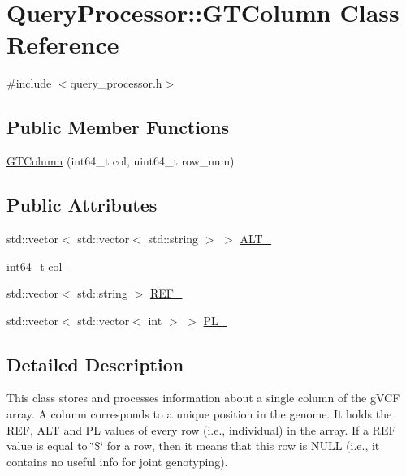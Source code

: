 \hypertarget{classQueryProcessor_1_1GTColumn}{}\section{Query\+Processor\+:\+:G\+T\+Column Class Reference}
\label{classQueryProcessor_1_1GTColumn}


{\ttfamily \#include $<$query\+\_\+processor.\+h$>$}

\subsection*{Public Member Functions}
\begin{DoxyCompactItemize}
\item 
\hyperlink{classQueryProcessor_1_1GTColumn_a09790bb0ef837116bb6f660c639dfd22}{G\+T\+Column} (int64\+\_\+t col, uint64\+\_\+t row\+\_\+num)
\end{DoxyCompactItemize}
\subsection*{Public Attributes}
\begin{DoxyCompactItemize}
\item 
std\+::vector$<$ std\+::vector$<$ std\+::string $>$ $>$ \hyperlink{classQueryProcessor_1_1GTColumn_abf580303e8ed309bea2d984d448984a4}{A\+L\+T\+\_\+}
\item 
int64\+\_\+t \hyperlink{classQueryProcessor_1_1GTColumn_a7155f2e2bcaec672df976209ab3b64cc}{col\+\_\+}
\item 
std\+::vector$<$ std\+::string $>$ \hyperlink{classQueryProcessor_1_1GTColumn_a368367e65449a63d93b96a800dc2ddc3}{R\+E\+F\+\_\+}
\item 
std\+::vector$<$ std\+::vector$<$ int $>$ $>$ \hyperlink{classQueryProcessor_1_1GTColumn_ae8ec6b1697723684e1c11a62cc4af5c9}{P\+L\+\_\+}
\end{DoxyCompactItemize}


\subsection{Detailed Description}
This class stores and processes information about a single column of the g\+V\+C\+F array. A column corresponds to a unique position in the genome. It holds the R\+E\+F, A\+L\+T and P\+L values of every row (i.\+e., individual) in the array. If a R\+E\+F value is equal to \char`\"{}\$\char`\"{} for a row, then it means that this row is N\+U\+L\+L (i.\+e., it contains no useful info for joint genotyping). 


